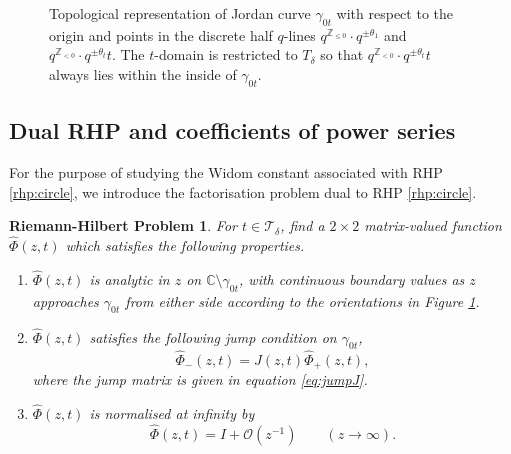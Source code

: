 \documentclass[a4paper,reqno,11pt]{amsart}
\numberwithin{equation}{section}
\numberwithin{figure}{section}
\theoremstyle{plain}
\newtheorem{rhprob}{Riemann-Hilbert Problem}
\theoremstyle{remark}
\newcounter{rhp}
\numberwithin{rhp}{section}
\begin{document}
\begin{figure}[ht]
	\caption{Topological representation of Jordan curve $\gamma_{0t}$ with respect to the origin and points in the discrete half $q$-lines 
 $q^{\mathbb{Z}_{\leq 0}} \cdot q^{\pm \theta_1}$ and
 $q^{\mathbb{Z}_{<0}} \cdot q^{\pm \theta_t}t$. The $t$-domain is restricted to $T_\delta$ so that $q^{\mathbb{Z}_{<0}} \cdot q^{\pm \theta_t}t$ always lies within the inside of $\gamma_{0t}$.}
	\label{fig:single_I}
\end{figure}	





\subsection{Dual RHP and coefficients of power series}
For the purpose of studying the Widom constant associated with RHP \ref{rhp:circle}, we introduce the factorisation problem dual to RHP \ref{rhp:circle}.
\begin{rhprob}\label{rhp:circledual} For $t\in \mathcal{T}_\delta$,
find a $2\times 2$ matrix-valued function $\widehat{\Phi}(z,t)$ which satisfies the following properties.
  \begin{enumerate}[label={{\rm (\roman *)}}]
  \item $\widehat{\Phi}(z,t)$ is analytic in $z$ on $\mathbb{C}\setminus \gamma_{0t}$, with continuous boundary values as $z$ approaches $\gamma_{0t}$ from either side according to the orientations in Figure \ref{fig:single_I}.
    \item $\widehat{\Phi}(z,t)$ satisfies the following jump condition on $\gamma_{0t}$,
\begin{equation}\label{eq:jumprhp}
    \widehat{\Phi}_-(z,t)=J(z,t)\widehat{\Phi}_+(z,t),
\end{equation}
where the jump matrix is given in equation \eqref{eq:jumpJ}.
 \item $\widehat{\Phi}(z,t)$ is normalised at infinity by
              \begin{equation*}
		\widehat{\Phi}(z,t)=I+\mathcal{O}(z^{-1})\qquad (z\rightarrow \infty).
              \end{equation*}
    \end{enumerate}
\end{rhprob}
\end{document}
